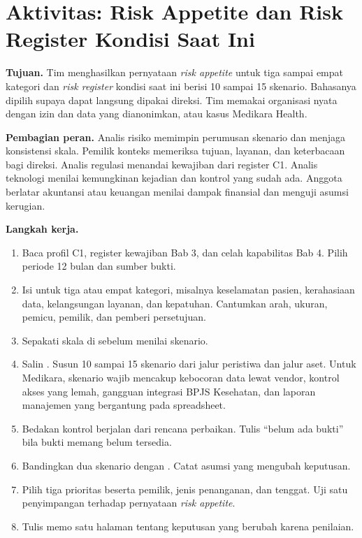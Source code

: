 \section{Aktivitas: Risk Appetite dan Risk Register Kondisi Saat Ini}

\textbf{Tujuan.} Tim menghasilkan pernyataan \textit{risk appetite} untuk tiga sampai empat kategori
dan \textit{risk register} kondisi saat ini berisi 10 sampai 15 skenario. Bahasanya dipilih supaya
dapat langsung dipakai direksi. Tim memakai organisasi nyata dengan izin dan data yang dianonimkan,
atau kasus Medikara Health.

\textbf{Pembagian peran.} Analis risiko memimpin perumusan skenario dan menjaga konsistensi skala.
Pemilik konteks memeriksa tujuan, layanan, dan keterbacaan bagi direksi. Analis regulasi menandai
kewajiban dari register C1. Analis teknologi menilai kemungkinan kejadian dan kontrol yang sudah ada.
Anggota berlatar akuntansi atau keuangan menilai dampak finansial dan menguji asumsi kerugian.

\textbf{Langkah kerja.}
\begin{enumerate}
  \item Baca profil C1, register kewajiban Bab 3, dan celah kapabilitas Bab 4. Pilih periode 12 bulan
  dan sumber bukti.
  \item Isi  untuk tiga atau empat kategori, misalnya
  keselamatan pasien, kerahasiaan data, kelangsungan layanan, dan kepatuhan. Cantumkan arah, ukuran,
  pemicu, pemilik, dan pemberi persetujuan.
  \item Sepakati skala di  sebelum menilai skenario.
  \item Salin . Susun 10 sampai 15 skenario dari jalur
  peristiwa dan jalur aset. Untuk Medikara, skenario wajib mencakup kebocoran data lewat vendor,
  kontrol akses yang lemah, gangguan integrasi BPJS Kesehatan, dan laporan manajemen yang bergantung
  pada spreadsheet.
  \item Bedakan kontrol berjalan dari rencana perbaikan. Tulis ``belum ada bukti'' bila bukti memang
  belum tersedia.
  \item Bandingkan dua skenario dengan . Catat
  asumsi yang mengubah keputusan.
  \item Pilih tiga prioritas beserta pemilik, jenis penanganan, dan tenggat. Uji satu penyimpangan
  terhadap pernyataan \textit{risk appetite}.
  \item Tulis memo satu halaman tentang keputusan yang berubah karena penilaian.
\end{enumerate}

